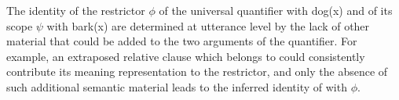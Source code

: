 \documentclass[output=paper]{langsci/langscibook}
\begin{document}
\begin{exe}
\ex\label{every-dog-barks-sem}
\end{exe}


The identity of the restrictor $\phi$ of the universal quantifier with
 {\normalfont \sffamily dog(x)} and of its scope $\psi$ with  {\normalfont \sffamily 
  bark(x)} are determined at utterance level by the lack of other
material that could be added to the two arguments of the
quantifier. For example, an extraposed relative clause which belongs
to  could consistently contribute its meaning
representation to the restrictor, and only the absence of such
additional semantic material leads to the inferred identity of  with
$\phi$.
\end{document}
